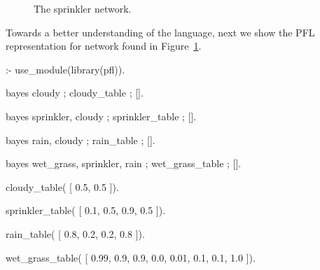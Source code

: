 \documentclass{article}
\begin{document}
\begin{figure}[t!]
\begin{center}
\caption{The sprinkler network.}
\label{fig:sprinkler-bn}
\end{center}
\end{figure}

Towards a better understanding of the language, next we show the PFL representation for network found in Figure~\ref{fig:sprinkler-bn}.

\begin{pflcode}
:- use_module(library(pfl)).

bayes cloudy ; cloudy_table ; [].

bayes sprinkler, cloudy ; sprinkler_table ; [].

bayes rain, cloudy ; rain_table ; [].

bayes wet_grass, sprinkler, rain ; wet_grass_table ; [].

cloudy_table(
    [ 0.5,
      0.5 ]).

sprinkler_table(
    [ 0.1, 0.5,
      0.9, 0.5 ]).

rain_table(
    [ 0.8, 0.2,
      0.2, 0.8 ]).

wet_grass_table(
    [ 0.99, 0.9, 0.9, 0.0,
      0.01, 0.1, 0.1, 1.0 ]).
\end{pflcode}
\end{document}
